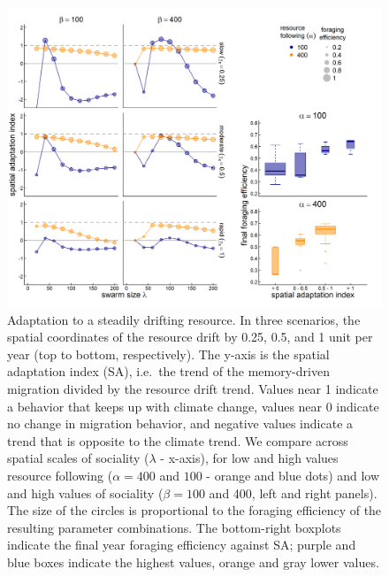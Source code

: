 \documentclass[utf8]{frontiersSCNS} %
\begin{document}
	\begin{figure}
		\includegraphics[width = \textwidth]{figures/SpatialClimateChange.png}
		
		\caption{\label{fig_adaptationclimate} Adaptation to a steadily drifting resource. In three scenarios, the spatial coordinates of the resource drift by 0.25, 0.5, and 1 unit per year (top to bottom, respectively). The y-axis is the spatial adaptation index (SA), i.e.~the trend of the memory-driven migration divided by the resource drift trend. Values near 1 indicate a behavior that keeps up with climate change, values near 0 indicate no change in migration behavior, and negative values indicate a trend that is opposite to the climate trend. We compare across spatial scales of sociality ($\lambda$ - x-axis), for low and high values resource following ($\alpha = 400$ and $100$ - orange and blue dots) and low and high values of sociality ($\beta = 100$ and 400, left and right panels). The size of the circles is proportional to the foraging efficiency of the resulting parameter combinations. The bottom-right boxplots indicate the final year foraging efficiency against SA; purple and blue boxes indicate the highest values, orange and gray lower values.}
	\end{figure}
	
\end{document}
